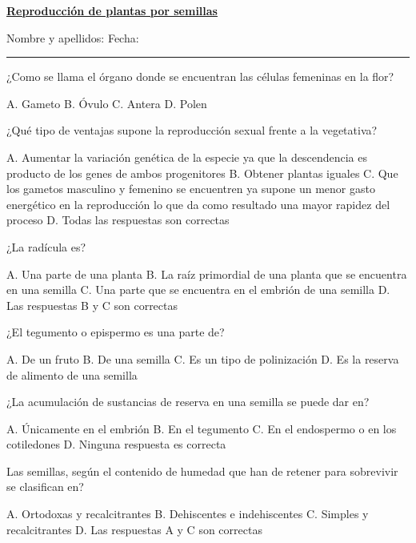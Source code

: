 \documentclass[11pt]{exam}
\newcommand\materia[1]{%
\parbox{\textwidth}{ \Large \sffamily \textbf{\uline{#1}}}\vspace{1em}}
\newcommand\nombrefecha{%
Nombre y apellidos:\hrulefill
Fecha:\rule{3.5cm}{0.4pt}\vspace{0.5em}}
\begin{document}
{\materia{Reproducción de plantas por semillas}

\nombrefecha

\begin{questions}
\question ¿Como se llama el órgano donde se encuentran las células femeninas en
  la flor?
  \begin{checkboxes}
    \choice A. Gameto
    \CorrectChoice B. Óvulo
    \choice C. Antera
    \choice D. Polen
  \end{checkboxes}
\question ¿Qué tipo de ventajas supone la reproducción sexual frente a la
  vegetativa?
  \begin{checkboxes}
    \CorrectChoice A. Aumentar la variación genética de la especie ya que la
    descendencia es producto de los genes de ambos progenitores
    \choice B. Obtener plantas iguales
    \choice C. Que los gametos masculino y femenino se encuentren ya supone 
    un menor gasto energético en la reproducción lo que da como resultado una
    mayor rapidez del proceso
    \choice D. Todas las respuestas son correctas 
  \end{checkboxes}
\question ¿La radícula es?
  \begin{checkboxes}
    \choice A. Una parte de una planta
    \choice B. La raíz primordial de una planta que se encuentra en una semilla
    \choice C. Una parte que se encuentra en el embrión de una semilla
    \CorrectChoice D. Las respuestas B y C son correctas
  \end{checkboxes}
\question ¿El tegumento o epispermo es una parte de?
  \begin{checkboxes}
    \choice A. De un fruto
    \CorrectChoice B. De una semilla
    \choice C. Es un tipo de polinización
    \choice D. Es la reserva de alimento de una semilla
  \end{checkboxes}
\question ¿La acumulación de sustancias de reserva en una semilla se puede dar
  en?
  \begin{checkboxes}
    \choice A. Únicamente en el embrión
    \choice B. En el tegumento
    \CorrectChoice C. En el endospermo o en los cotiledones
    \choice D. Ninguna respuesta es correcta 
  \end{checkboxes}
\question Las semillas, según el contenido de humedad que han de retener para
  sobrevivir se clasifican en?
  \begin{checkboxes}
    \CorrectChoice A. Ortodoxas y recalcitrantes
    \choice B. Dehiscentes e indehiscentes
    \choice C. Simples y recalcitrantes
    \choice D. Las respuestas A y C son correctas

\end{checkboxes}
\end{questions}}
\end{document}
